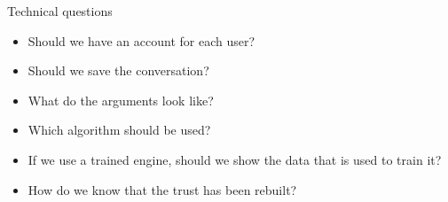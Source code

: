 \documentclass[t,french,mathserif]{beamer}
\begin{document}
\begin{frame}{Technical questions}
	\begin{itemize}
        \item Should we have an account for each user?
        \item Should we save the conversation?
        \item What do the arguments look like?
        \item Which algorithm should be used?
        \item If we use a trained engine, should we show the data that is used to train it?
        \item How do we know that the trust has been rebuilt?
	\end{itemize}
\end{frame}
\end{document}
